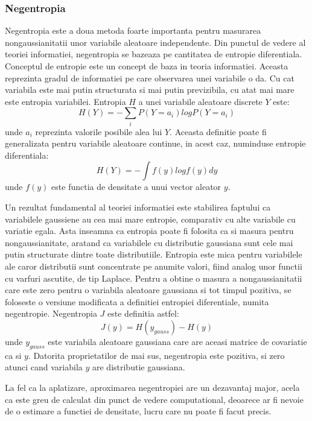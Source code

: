 \documentclass[12pt]{article}
\begin{document}
\subsubsection{Negentropia}
Negentropia este a doua metoda foarte importanta pentru masurarea nongaussianitatii unor variabile aleatoare independente. Din punctul de vedere al teoriei informatiei, negentropia se bazeaza pe cantitatea de entropie diferentiala. Conceptul de entropie este un concept de baza in teoria informatiei. Aceasta reprezinta gradul de informatiei pe care observarea unei variabile o da. Cu cat variabila este mai putin structurata si mai putin previzibila, cu atat mai mare este entropia variabilei. Entropia $H$ a unei variabile aleatoare discrete $Y$ este:
\begin{equation}
	H(Y)=-\sum_i P(Y=a_i)log P(Y=a_i)
\end{equation}
unde $a_i$ reprezinta valorile posibile alea lui $Y$. Aceasta definitie poate fi generalizata pentru variabile aleatoare continue, in acest caz, numinduse entropie diferentiala:
\begin{equation}
H(Y)=-\int f(y) logf(y)dy	
\end{equation}
unde $f(y)$ este functia de densitate a unui vector aleator $y$.

Un rezultat fundamental al teoriei informatiei este stabilirea faptului ca variabilele gaussiene au cea mai mare entropie, comparativ cu alte variabile cu variatie egala. Asta inseamna ca entropia poate fi folosita ca si masura pentru nongaussianitate, aratand ca variabilele cu distributie gaussiana sunt cele mai putin structurate dintre toate distributiile. Entropia este mica pentru variabilele ale caror distributii sunt concentrate pe anumite valori, fiind analog unor functii cu varfuri ascutite, de tip Laplace. Pentru a obtine o masura a nongaussianitatii care este zero pentru o variabila aleatoare gaussiana si tot timpul pozitiva, se foloseste o versiune modificata a definitiei entropiei diferentiale, numita negentropie. Negentropia $J$ este definitia astfel:
\begin{equation}
	J(y)=H(y_{gauss})-H(y)	
\end{equation}
unde $y_{gauss}$ este variabila aleatoare gaussiana care are aceasi matrice de covariatie ca si $y$. Datorita proprietatilor de mai sus, negentropia este pozitiva, si zero atunci cand variabila $y$ are distributie gaussiana. 

La fel ca la aplatizare, aproximarea negentropiei are un dezavantaj major, acela ca este greu de calculat din punct de vedere computational, deoarece ar fi nevoie de o estimare a functiei de densitate, lucru care nu poate fi facut precis. 
\end{document}
